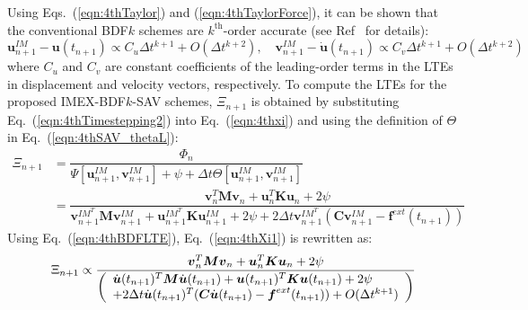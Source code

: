 \documentclass[review]{elsarticle}
\begin{document}
Using Eqs.~(\ref{eqn:4thTaylor}) and (\ref{eqn:4thTaylorForce}), it can be shown that the conventional BDF$k$ schemes are $k^{\textrm{th}}$-order accurate (see Ref~ \cite{iserles2009first} for details): 
\begin{equation}
    \boldsymbol{u}^{IM}_{n+1} - \boldsymbol{u}(t_{n+1}) \propto  C_{u} \Delta t^{k+1} + O(\Delta t^{k+2}), \quad \boldsymbol{v}^{IM}_{n+1} - \dot{\boldsymbol{u}}(t_{n+1}) \propto C_{v} \Delta t^{k+1} + O(\Delta t^{k+2})
    \label{eqn:4thBDFLTE}
\end{equation}
where $C_{u}$ and $C_{v}$ are constant coefficients of the leading-order terms in the LTEs in displacement and velocity vectors, respectively.
To compute the LTEs for the proposed IMEX-BDF$k$-SAV schemes, $\Xi_{n+1}$ is obtained by substituting Eq.~(\ref{eqn:4thTimestepping2}) into Eq.~(\ref{eqn:4thxi}) and using the definition of $\Theta$ in Eq.~(\ref{eqn:4thSAV_thetaL}):
\begin{equation}
    \begin{array}{ll}
        \Xi_{n+1}&=\dfrac{\Phi_n}{ \Psi[\boldsymbol{u}_{n+1}^{IM},\boldsymbol{v}_{n+1}^{IM}]+\psi + \Delta t \Theta[\boldsymbol{u}_{n+1}^{IM},\boldsymbol{v}_{n+1}^{IM}]} \\
        &=\dfrac{ \boldsymbol{v}_n^T\boldsymbol{M}\boldsymbol{v}_n + \boldsymbol{u}_n^T\boldsymbol{K}\boldsymbol{u}_n + 2\psi}{ \boldsymbol{v}^{IM^T}_{n+1}\boldsymbol{M}\boldsymbol{v}^{IM}_{n+1}+ \boldsymbol{u}^{IM^T}_{n+1}\boldsymbol{K}\boldsymbol{u}^{IM}_{n+1} + 2\psi + 2\Delta t \boldsymbol{v}_{n+1}^{IM^T} (\boldsymbol{C} \boldsymbol{v}_{n+1}^{IM} - \boldsymbol{f}^{ext}(t_{n+1})) }
    \end{array}    
    \label{eqn:4thXi1}
\end{equation}
Using Eq.~(\ref{eqn:4thBDFLTE}), Eq.~(\ref{eqn:4thXi1}) is rewritten as:
\begin{equation}
    \Xi_{n+1} \propto \dfrac{ \boldsymbol{v}_n^T\boldsymbol{M}\boldsymbol{v}_n + \boldsymbol{u}_n^T\boldsymbol{K}\boldsymbol{u}_n + 2\psi}{ 
    \left(\begin{array}{l}
        \dot{\boldsymbol{u}}(t_{n+1})^T\boldsymbol{M}\dot{\boldsymbol{u}}(t_{n+1}) + \boldsymbol{u}(t_{n+1})^T\boldsymbol{K}\boldsymbol{u}(t_{n+1}) + 2\psi \\
         + 2\Delta t\dot{\boldsymbol{u}}(t_{n+1})^T (\boldsymbol{C} \dot{\boldsymbol{u}}(t_{n+1}) - \boldsymbol{f}^{ext}(t_{n+1})) + O(\Delta t^{k+1})
    \end{array}\right)
    } \\
    \label{eqn:4thXi2}
\end{equation}
\end{document}
